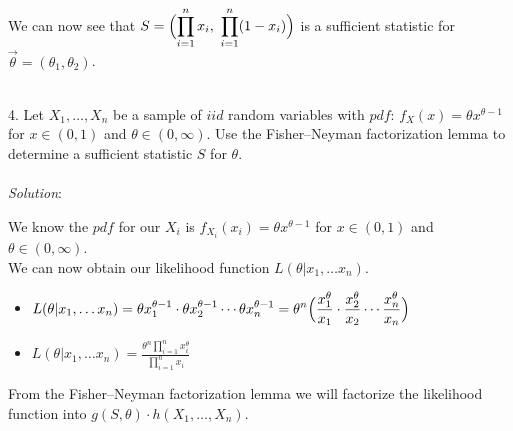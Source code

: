 \documentclass[12pt]{article}
\newcommand{\XB}{\color{black}}
\newcommand{\XBB}{\color{blue}}
\newcommand{\XV}{\color{violet}}
\begin{document}
\noindent
We can now see that $ \displaystyle S = \Bigl( \prod_{i=1}^{n} x_{i} , \ \prod_{i=1}^{n} (1 - x_{i}) \Bigr) $ is a sufficient statistic for $ \overrightarrow{\theta} = (\theta_{1}, \theta_{2}) $.

\newpage
\XBB\hrulefill\XB \\

4. Let $ X_{1},\dots,X_{n} $ be a sample of $ iid $ random variables with $ pdf $: $ f_{X}(x) = \theta x^{\theta - 1} $ for $ x \in (0, 1) $ and $ \theta \in (0, \infty) $.
Use the Fisher–Neyman factorization lemma to determine a sufficient statistic $ S $ for $ \theta $. \\

\XBB\hrulefill\XB
\vspace{5mm} \\


\textit{Solution}:
\vspace{2.5mm}

\noindent
We know the $ pdf $ for our $ \displaystyle X_{i} $ is $ \displaystyle f_{X_{i}}(x_{i}) = \theta x^{\theta - 1} $ for $ x \in (0, 1) $ and $ \theta \in (0, \infty) $. \\

We can now obtain our likelihood function $ L(\theta | x_{1}, \dots x_{n}) $. \\
\begin{itemize}
    \item $ \displaystyle L(\theta | x_{1}, \dots x_{n}) = \theta x_{1}^{\theta - 1} \cdot \theta x_{2}^{\theta - 1} \cdots \theta x_{n}^{\theta - 1} = \theta^{n} \Bigl( \frac{x_{1}^{\theta}}{x_{1}} \cdot \frac{x_{2}^{\theta}}{x_{2}} \cdots \frac{x_{n}^{\theta}}{x_{n}} \Bigr) $
    \item $ \displaystyle L(\theta | x_{1}, \dots x_{n}) = \frac{ \theta^{n} \prod_{i=1}^{n} x_{i}^{\theta} }{ \prod_{i=1}^{n} x_{i} } $
\end{itemize}

\noindent
From the Fisher–Neyman factorization lemma we will factorize the likelihood function into $ g(S, \theta) \cdot h(X_{1}, \dots , X_{n}) $. \\
\end{document}
